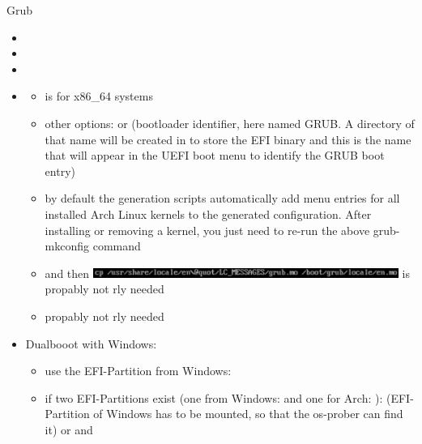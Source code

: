 \begin{frame}{Grub}
  \begin{itemize}
    \item {}
    \item {}
    \item {}
    \item {}
      \begin{itemize}
        \item {} is for x86_64 systems
        \item other options:  or  (bootloader identifier, here named GRUB. A directory of that name will be created in  to store the EFI binary and this is the name that will appear in the UEFI boot menu to identify the GRUB boot entry)
        \item by default the generation scripts automatically add menu entries for all installed Arch Linux kernels to the generated configuration. After installing or removing a kernel, you just need to re-run the above grub-mkconfig command
      \end{itemize}
      \begin{Sidenote}
        \begin{itemize}
          \scriptsize
          \item {} and then \includegraphics[height=0.3cm]{./figures/cp.png} is propably not rly needed
          \item {} propably not rly needed
        \end{itemize}
      \end{Sidenote}
    \item \alert{Dualbooot with Windows:}
      \begin{itemize}
        \item use the EFI-Partition from Windows: 
        \item if two EFI-Partitions exist (one from Windows:   and one for Arch: ):  (EFI-Partition of Windows has to be mounted, so that the os-prober can find it) or  and 

\end{itemize}
\end{itemize}
\end{frame}

